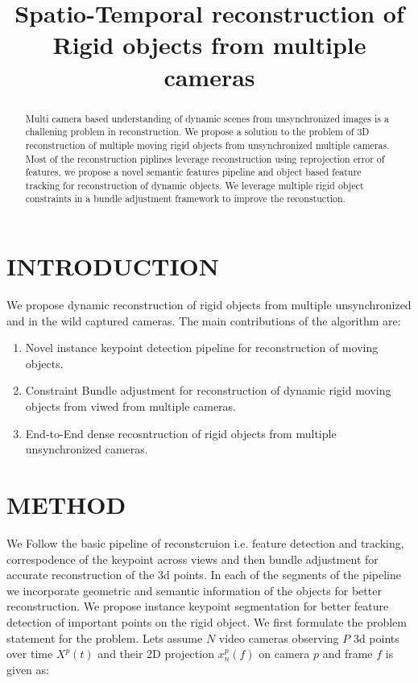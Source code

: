 \documentclass[10pt,twocolumn,letterpaper]{article}
\begin{document}
\title{Spatio-Temporal reconstruction of Rigid objects from multiple cameras}


\maketitle

\begin{abstract}
Multi camera based understanding of dynamic scenes from unsynchronized images is a challening problem in reconstruction. We propose a solution to the problem of 3D reconstruction of multiple moving rigid objects from unsynchronized multiple cameras. Most of the reconstruction piplines leverage reconstruction using reprojection error of features, we propose a novel semantic features pipeline and object based feature tracking for reconstruction of dynamic objects. We leverage multiple rigid object constraints in a bundle adjustment framework to improve the reconstuction. \end{abstract}
\section{INTRODUCTION}
We propose dynamic reconstruction of rigid objects from multiple unsynchronized and in the wild captured cameras. The main contributions of the algorithm are:
\begin{enumerate}
\item Novel instance keypoint detection pipeline for reconstruction of moving objects.
\item Constraint Bundle adjustment for reconstruction of dynamic rigid moving objects from viwed from multiple cameras. 
\item End-to-End dense recosntruction of rigid objects from multiple unsynchronized cameras.
\end{enumerate}
\section{METHOD}
We Follow the basic pipeline of reconstcruion i.e. feature detection and tracking, correspodence of the keypoint across views and then bundle adjustment for accurate reconstruction of the 3d points. In each of the segments of the pipeline we incorporate geometric and semantic information of the objects for better reconstruction. We propose instance keypoint segmentation for better feature detection of important points on the rigid object. 
We first formulate the problem statement for the problem. Lets assume $N$ video cameras observing $P$ 3d points over time $X^p(t)$ and their 2D projection $x^p_n(f)$ on camera $p$ and frame $f$ is given as:
\end{document}
